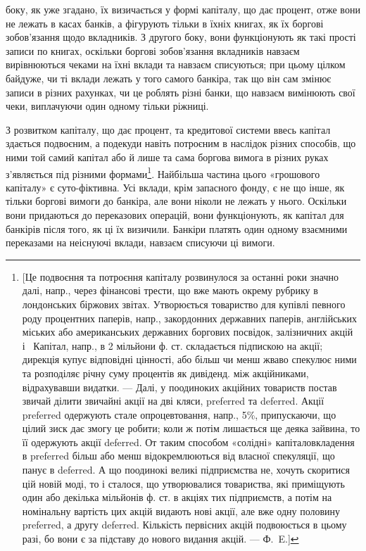 \parcont{}  %
боку, як уже згадано, їх визичається у формі капіталу, що дає процент, отже
вони не лежать в касах банків, а фігурують тільки в їхніх книгах, як їх боргові
зобов’язання щодо вкладників. З другого боку, вони функціонують як такі прості
записи по книгах, оскільки боргові зобов’язання вкладників навзаєм вирівнюються
чеками на їхні вклади та навзаєм списуються; при цьому цілком байдуже,
чи ті вклади лежать у того самого банкіра, так що він сам змінює записи
в різних рахунках, чи це роблять різні банки, що навзаєм вимінюють свої
чеки, виплачуючи один одному тільки ріжниці.

З розвитком капіталу, що дає процент, та кредитової системи ввесь капітал
здається подвоєним, а подекуди навіть потроєним в наслідок різних способів,
що ними той самий капітал або й лише та сама боргова вимога в різних
руках з’являється під різними формами\footnote{
[Це подвоєння та потроєння капіталу розвинулося за останні роки значно далі, напр., через
фінансові трести, що вже мають окрему рубрику в лондонських біржових звітах. Утворюється товариство
для купівлі певного роду процентних паперів, напр., закордонних державних паперів, англійських
міських або американських державних боргових посвідок, залізничних акцій і~ Капітал,
напр., в 2 мільйони ф. ст. складається підпискою на акції; дирекція купує відповідні цінності, або
більш чи менш жваво спекулює ними та розподіляє річну суму процентів як дивіденд. між акційниками,
відрахувавши видатки. — Далі, у поодиноких акційних товариств постав звичай ділити звичайні акції
на дві кляси, preferred та deferred. Акції preferred одержують стале опроцевтовання, напр., 5\%,
припускаючи, що цілий зиск дає змогу це робити; коли ж потім лишається ще деяка зайвина, то її
одержують акції deferred. От таким способом «солідні» капіталовкладення в preferred більш або менш
відокремлюються від власної спекуляції, що панує в deferred. А що поодинокі великі підприємства
не, хочуть скоритися цій новій моді, то і сталося, що утворювалися товариства, які приміщують один
або декілька мільйонів ф. ст. в акціях тих підприємств, а потім на номінальну вартість цих акцій
видають
нові акції, але вже одну половину preferred, а другу deferred. Кількість первісних акцій подвоюється
в цьому разі, бо вони є за підставу до нового видання акцій. — Ф.~E.]
}. Найбільша частина цього «грошового
капіталу» є суто-фіктивна. Усі вклади, крім запасного фонду, є не що інше,
як тільки боргові вимоги до банкіра, але вони ніколи не лежать у нього. Оскільки
вони придаються до переказових операцій, вони функціонують, як капітал для
банкірів після того, як ці їх визичили. Банкіри платять один одному взаємними
переказами на неіснуючі вклади, навзаєм списуючи ці вимоги.

